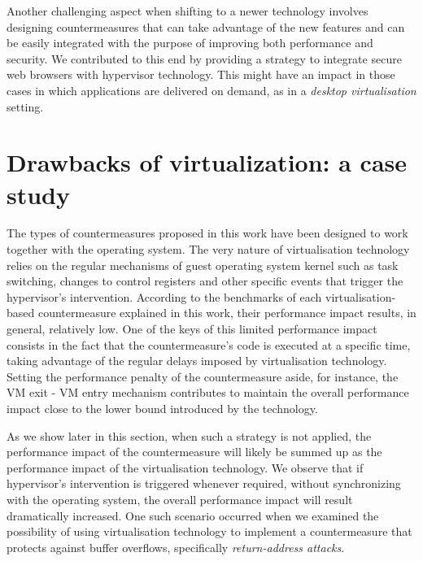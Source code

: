 Another challenging aspect when shifting to a newer technology involves designing countermeasures that can take 
advantage of the new features and can be easily integrated with the purpose of improving both performance and security. We contributed to this end by providing a strategy to integrate secure web browsers with hypervisor technology. This might have an impact in those cases in which applications are delivered on demand, as in a \emph{desktop virtualisation} setting.



\section{Drawbacks of virtualization: a case study}\label{virt:drawback}
The types of countermeasures proposed in this work have been designed to work together with the operating system.  The very nature of virtualisation technology relies on the regular mechanisms of guest operating system kernel such as task switching, changes to control registers and other specific events that trigger the hypervisor's intervention.
According to the benchmarks of each virtualisation-based countermeasure explained in this work, their performance impact results, in general, relatively low. One of the keys of this limited performance impact consists in the fact that the countermeasure's code is executed at a specific time, taking advantage of the regular delays imposed by virtualisation technology. Setting the performance penalty of the countermeasure aside, for instance, the VM exit - VM entry mechanism contributes to maintain the overall performance impact close to the lower bound introduced by the technology. 

As we show later in this section, when such a strategy is not applied, the performance impact of the countermeasure will likely be summed up as the performance impact of the virtualisation technology. We observe that if hypervisor's intervention is triggered whenever required, without synchronizing with the operating system, the overall performance impact will result dramatically increased. One such scenario occurred when we examined the possibility of using virtualisation technology to implement a countermeasure that protects against buffer overflows, specifically \emph{return-address attacks}. 


